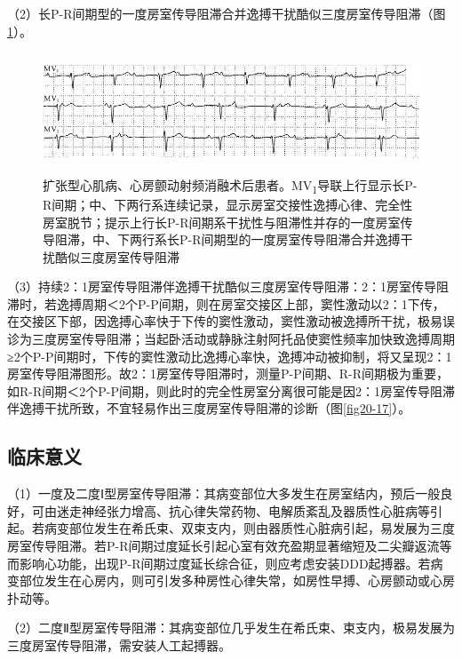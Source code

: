 （2）长P-R间期型的一度房室传导阻滞合并逸搏干扰酷似三度房室传导阻滞（图\ref{fig20-18}）。

\begin{figure}[!htbp]
 \centering
 \includegraphics[width=5.58333in,height=1.40625in]{./images/Image00347.jpg}
 \captionsetup{justification=centering}
 \caption{扩张型心肌病、心房颤动射频消融术后患者。MV\textsubscript{1}导联上行显示长P-R间期；中、下两行系连续记录，显示房室交接性逸搏心律、完全性房室脱节；提示上行长P-R间期系干扰性与阻滞性并存的一度房室传导阻滞，中、下两行系长P-R间期型的一度房室传导阻滞合并逸搏干扰酷似三度房室传导阻滞}
 \label{fig20-18}
  \end{figure} 


（3）持续2：1房室传导阻滞伴逸搏干扰酷似三度房室传导阻滞：2：1房室传导阻滞时，若逸搏周期＜2个P-P间期，则在房室交接区上部，窦性激动以2：1下传，在交接区下部，因逸搏心率快于下传的窦性激动，窦性激动被逸搏所干扰，极易误诊为三度房室传导阻滞；当起卧活动或静脉注射阿托品使窦性频率加快致逸搏周期≥2个P-P间期时，下传的窦性激动比逸搏心率快，逸搏冲动被抑制，将又呈现2：1房室传导阻滞图形。故2：1房室传导阻滞时，测量P-P间期、R-R间期极为重要，如R-R间期＜2个P-P间期，则此时的完全性房室分离很可能是因2：1房室传导阻滞伴逸搏干扰所致，不宜轻易作出三度房室传导阻滞的诊断（图\ref{fig20-17}）。

\protect\hypertarget{text00027.htmlux5cux23subid331}{}{}

\subsection{临床意义}

（1）一度及二度Ⅰ型房室传导阻滞：其病变部位大多发生在房室结内，预后一般良好，可由迷走神经张力增高、抗心律失常药物、电解质紊乱及器质性心脏病等引起。若病变部位发生在希氏束、双束支内，则由器质性心脏病引起，易发展为三度房室传导阻滞。若P-R间期过度延长引起心室有效充盈期显著缩短及二尖瓣返流等而影响心功能，出现P-R间期过度延长综合征，则应考虑安装DDD起搏器。若病变部位发生在心房内，则可引发多种房性心律失常，如房性早搏、心房颤动或心房扑动等。

（2）二度Ⅱ型房室传导阻滞：其病变部位几乎发生在希氏束、束支内，极易发展为三度房室传导阻滞，需安装人工起搏器。

